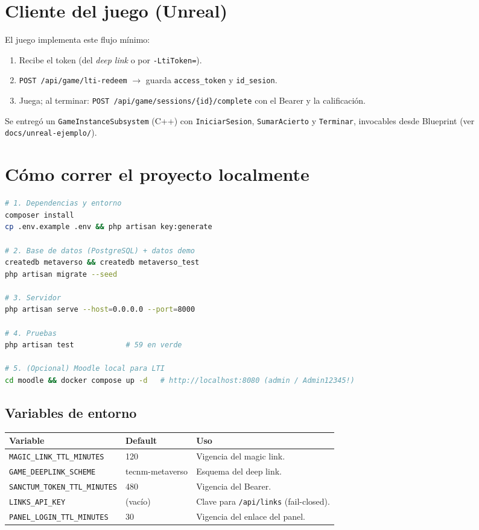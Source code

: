 \documentclass[11pt,letterpaper]{article}
\begin{document}
\section{Cliente del juego (Unreal)}
El juego implementa este flujo mínimo:
\begin{enumerate}[leftmargin=1.5em,nosep]
  \item Recibe el token (del \emph{deep link} o por \texttt{-LtiToken=}).
  \item \texttt{POST /api/game/lti-redeem} $\rightarrow$ guarda \texttt{access\_token} y \texttt{id\_sesion}.
  \item Juega; al terminar: \texttt{POST /api/game/sessions/\{id\}/complete} con el Bearer y la calificación.
\end{enumerate}
Se entregó un \texttt{GameInstanceSubsystem} (C++) con
\texttt{IniciarSesion}, \texttt{SumarAcierto} y \texttt{Terminar}, invocables
desde Blueprint (ver \texttt{docs/unreal-ejemplo/}).

\section{Cómo correr el proyecto localmente}
\begin{lstlisting}[language=bash]
# 1. Dependencias y entorno
composer install
cp .env.example .env && php artisan key:generate

# 2. Base de datos (PostgreSQL) + datos demo
createdb metaverso && createdb metaverso_test
php artisan migrate --seed

# 3. Servidor
php artisan serve --host=0.0.0.0 --port=8000

# 4. Pruebas
php artisan test            # 59 en verde

# 5. (Opcional) Moodle local para LTI
cd moodle && docker compose up -d   # http://localhost:8080 (admin / Admin12345!)
\end{lstlisting}

\subsection{Variables de entorno}
\begin{longtable}{p{5.6cm} p{3cm} p{6cm}}
\toprule \textbf{Variable} & \textbf{Default} & \textbf{Uso} \\ \midrule
\endhead
\texttt{MAGIC\_LINK\_TTL\_MINUTES} & 120 & Vigencia del magic link. \\
\texttt{GAME\_DEEPLINK\_SCHEME} & tecnm-metaverso & Esquema del deep link. \\
\texttt{SANCTUM\_TOKEN\_TTL\_MINUTES} & 480 & Vigencia del Bearer. \\
\texttt{LINKS\_API\_KEY} & (vacío) & Clave para \texttt{/api/links} (fail-closed). \\
\texttt{PANEL\_LOGIN\_TTL\_MINUTES} & 30 & Vigencia del enlace del panel. \\
\bottomrule
\end{longtable}
\end{document}

